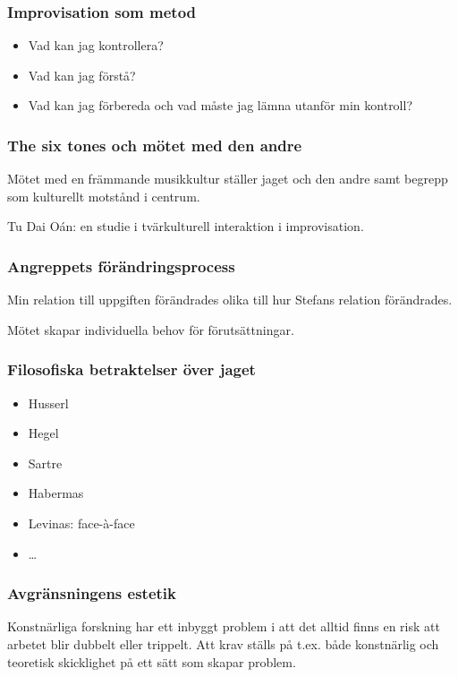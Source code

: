\documentclass[ignorenonframetext]{beamer}
\begin{document}
\begin{frame}
  \frametitle{Improvisation som metod}
  
  \begin{itemize}[<+->]
  \item Vad kan jag kontrollera?
  \item Vad kan jag förstå?
  \item Vad kan jag förbereda och vad måste jag lämna utanför min kontroll?
  \end{itemize}

\end{frame}

\begin{frame}
  \frametitle{The six tones och mötet med den andre}
  Mötet med en främmande musikkultur ställer jaget och den andre samt begrepp som kulturellt motstånd i centrum.

  Tu Dai O\'{a}n: en studie i tvärkulturell interaktion i improvisation.
  
\end{frame}

\begin{frame}
  \frametitle{Angreppets förändringsprocess}
  
  Min relation till uppgiften förändrades olika till hur Stefans relation förändrades.

  \vspace{0.5cm}

  Mötet skapar individuella behov för förutsättningar.

\end{frame}

\begin{frame}
  \frametitle{Filosofiska betraktelser över jaget}
  \begin{itemize}[<+-]>
  \item Husserl
  \item Hegel 
  \item Sartre
  \item Habermas
  \item Levinas: face-à-face
  \item \ldots
  \end{itemize}
\end{frame}

\begin{frame}
  \frametitle{Avgränsningens estetik}
  
  Konstnärliga forskning har ett inbyggt problem i att det alltid finns en risk att arbetet blir dubbelt eller trippelt. Att krav ställs på t.ex. både konstnärlig och teoretisk skicklighet på ett sätt som skapar problem.
  
\end{frame}
\end{document}
